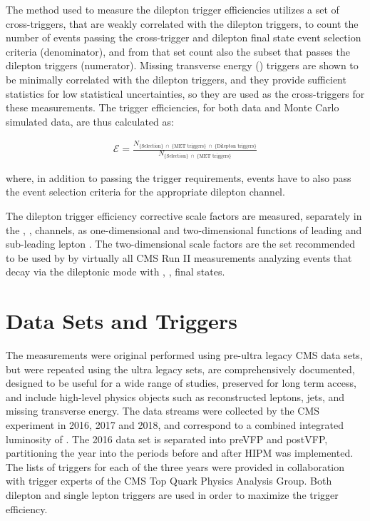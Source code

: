 The method used to measure the dilepton trigger efficiencies utilizes a set of cross-triggers, that are weakly correlated with the dilepton triggers, to count the number of events passing the cross-trigger and \ttbar dilepton final state event selection criteria (denominator), and from that set count also the subset that passes the dilepton triggers (numerator).
Missing transverse energy (\MET) triggers are shown to be minimally correlated with the dilepton triggers, and they provide sufficient statistics for low statistical uncertainties, so they are used as the cross-triggers for these measurements. 
The trigger efficiencies, for both data and Monte Carlo simulated data, are thus calculated as: 
\begin{linenomath*}
\begin{align}
\mathcal{E} = \frac{N_{\{\text{Selection}\} \; \cap \; \{\text{MET triggers}\} \; \cap \; \{\text{Dilepton triggers\}}}}{N_{\{\text{Selection}\} \; \cap \; \{\text{MET triggers\}}}}
\label{efficiency}
\end{align}
\end{linenomath*}
where, in addition to passing the trigger requirements, events have to also pass the event selection criteria for the appropriate dilepton channel. 

The dilepton trigger efficiency corrective scale factors are measured, separately in the \ee, \emu, \mumu channels, as one-dimensional and two-dimensional functions of leading and sub-leading lepton \pT.
The two-dimensional scale factors are the set recommended to be used by by virtually all CMS Run II measurements analyzing \ttbar events that decay via the dileptonic mode with \ee, \emu, \mumu final states.

\section{Data Sets and Triggers}
The measurements were original performed using pre-ultra legacy CMS data sets, but were repeated using the ultra legacy sets, are comprehensively documented, designed to be useful for a wide range of studies, preserved for long term access, and include high-level physics objects such as reconstructed leptons, jets, and missing transverse energy.
The data streams were collected by the CMS experiment in 2016, 2017 and 2018, and correspond to a combined integrated luminosity of \lumivalueRuniiUL.
The 2016 data set is separated into preVFP and postVFP, partitioning the year into the periods before and after HIPM was implemented.
The lists of triggers for each of the three years were provided in collaboration with trigger experts of the CMS Top Quark Physics Analysis Group. 
Both dilepton and single lepton triggers are used in order to maximize the trigger efficiency. 

